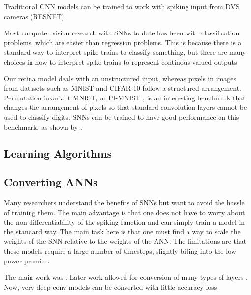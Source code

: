 \documentclass[../taasin.tex]{subfiles}
\begin{document}
Traditional CNN models can be trained to work with spiking input from DVS cameras (RESNET) \cite{resnet_events}


Most computer vision research with SNNs to date has been with classification problems, which are easier than regression problems. This is because there is a standard way to interpret spike trains to classify something, but there are many choices in how to interpret spike trains to represent continous valued outputs

Our retina model deals with an unstructured input, whereas pixels in images from datasets such as MNIST and CIFAR-10 follow a structured arrangement. Permutation invariant MNIST, or PI-MNIST \cite{le2015simple}, is an interesting benchmark that changes the arrangement of pixels so that standard convolution layers cannot be used to classify digits. SNNs can be trained to have good performance on this benchmark, as shown by \cite{nengo}.


\subsection{Learning Algorithms}



\subsection{Converting ANNs}

Many researchers understand the benefits of SNNs but want to avoid the hassle of training them. The main advantage is that one does not have to worry about the non-differentiability of the spiking function and can simply train a model in the standard way. The main task here is that one must find a way to scale the weights of the SNN relative to the weights of the ANN. The limitations are that these models require a large number of timesteps, slightly biting into the low power promise.

The main work was \cite{convert_no_bias}. Later work allowed for conversion of many types of layers \cite{convert_with_bias}. Now, very deep conv models can be converted with little accuracy loss \cite{convert_VGG}.
\end{document}
